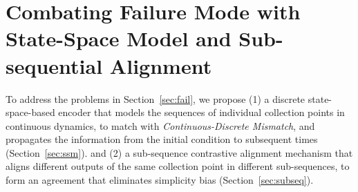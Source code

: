 















\vspace{-1mm}

\section{Combating Failure Mode with State-Space Model and Sub-sequential Alignment}
\label{sec:ssmsub}


    To address the problems in Section~\ref{sec:fail}, we propose (1) a discrete state-space-based encoder that models the sequences of individual collection points in continuous dynamics, to match with \textit{Continuous-Discrete Mismatch}, and propagates the information from the initial condition to subsequent times (Section~\ref{sec:ssm}).  and (2) a sub-sequence contrastive alignment mechanism that aligns different outputs of the same collection point in different sub-sequences, to form an agreement that eliminates simplicity bias (Section~\ref{sec:subseq}).
    
